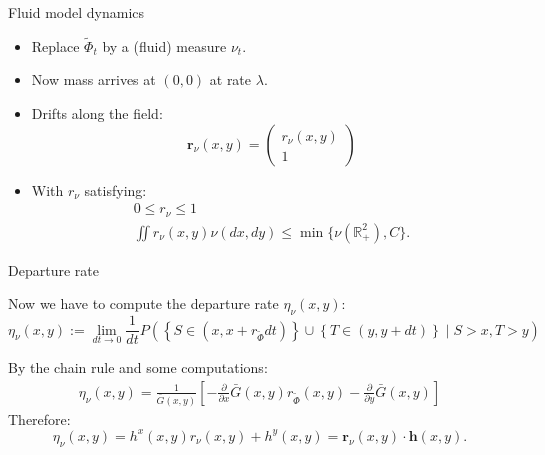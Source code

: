 \documentclass[aspectratio=169]{beamer}
\newcommand{\R}{\mathbb{R}}
\begin{document}
\begin{frame}{Fluid model dynamics}

	\begin{itemize}
		\item Replace $\tilde{\Phi}_t$ by a (fluid) measure $\nu_t$.
		\item Now mass arrives at $(0,0)$ at rate $\lambda$.
		\item Drifts along the field:
		 \begin{equation*}
			\mathbf{r}_\nu(x,y) = \begin{pmatrix}
				r_\nu (x,y) \\ 1
			\end{pmatrix}
		 \end{equation*}
		 \item With $r_\nu$ satisfying:
		 \begin{gather*}
			0\leqslant r_\nu \leqslant 1 \\
			\iint r_\nu(x,y) \nu(dx,dy) \leqslant \min\{\nu(\R^2_+),C\}.
		 \end{gather*}
	\end{itemize}
\end{frame}

\begin{frame}{Departure rate}

	Now we have to compute the departure rate $\eta_{\nu}(x,y)$:
	\begin{equation*}
		\eta_\nu(x,y) := \lim_{dt\to 0} \frac{1}{dt} P\left(\left\{S\in\left(x,x+r_{\tilde\Phi}dt\right)\right\}\cup \left\{T\in\left(y,y+dt\right)\right\}\mid S>x,T>y\right)
	\end{equation*}

	By the chain rule and some computations:
	\begin{gather*}
		\eta_{\nu}(x,y) =\frac{1}{\bar{G}(x,y)}\left[-\frac{\partial}{\partial x} \bar{G}(x,y) r_{\tilde\Phi}(x,y) - \frac{\partial}{\partial y} \bar{G}(x,y)\right]
	\end{gather*}
	\pause
	Therefore:
	\begin{equation*}
	\eta_{\nu}(x,y) = h^x(x,y)r_{\nu}(x,y)+h^y(x,y) = \mathbf{r}_{\nu}(x,y) \cdot \mathbf{h}(x,y).
	\end{equation*}

\end{frame}
\end{document}
